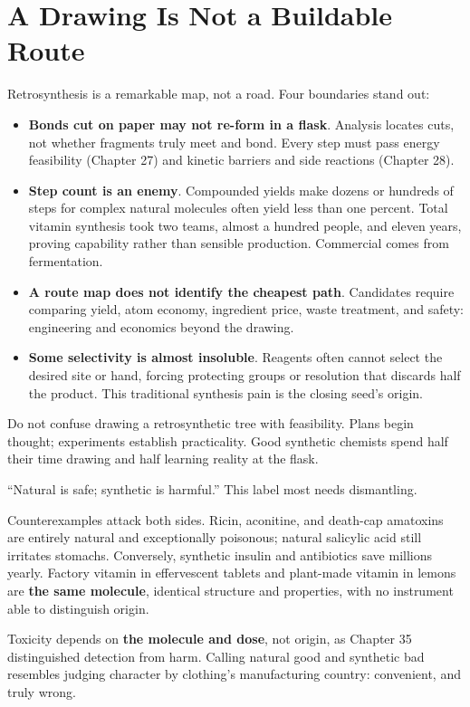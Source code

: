 \section{A Drawing Is Not a Buildable Route}

Retrosynthesis is a remarkable map, not a road. Four boundaries stand out:

\begin{itemize}[itemsep=2pt]
\item \textbf{Bonds cut on paper may not re-form in a flask}. Analysis locates cuts, not whether fragments truly meet and bond. Every step must pass energy feasibility (Chapter 27) and kinetic barriers and side reactions (Chapter 28).
\item \textbf{Step count is an enemy}. Compounded yields make dozens or hundreds of steps for complex natural molecules often yield less than one percent. Total vitamin  synthesis took two teams, almost a hundred people, and eleven years, proving capability rather than sensible production. Commercial  comes from fermentation.
\item \textbf{A route map does not identify the cheapest path}. Candidates require comparing yield, atom economy, ingredient price, waste treatment, and safety: engineering and economics beyond the drawing.
\item \textbf{Some selectivity is almost insoluble}. Reagents often cannot select the desired site or hand, forcing protecting groups or resolution that discards half the product. This traditional synthesis pain is the closing seed's origin.
\end{itemize}

Do not confuse drawing a retrosynthetic tree with feasibility. Plans begin thought; experiments establish practicality. Good synthetic chemists spend half their time drawing and half learning reality at the flask.

\begin{wuqu}
``Natural is safe; synthetic is harmful.'' This label most needs dismantling.

Counterexamples attack both sides. Ricin, aconitine, and death-cap amatoxins are entirely natural and exceptionally poisonous; natural salicylic acid still irritates stomachs. Conversely, synthetic insulin and antibiotics save millions yearly. Factory vitamin  in effervescent tablets and plant-made vitamin  in lemons are \textbf{the same molecule}, identical structure and properties, with no instrument able to distinguish origin.

Toxicity depends on \textbf{the molecule and dose}, not origin, as Chapter 35 distinguished detection from harm. Calling natural good and synthetic bad resembles judging character by clothing's manufacturing country: convenient, and truly wrong.
\end{wuqu}

